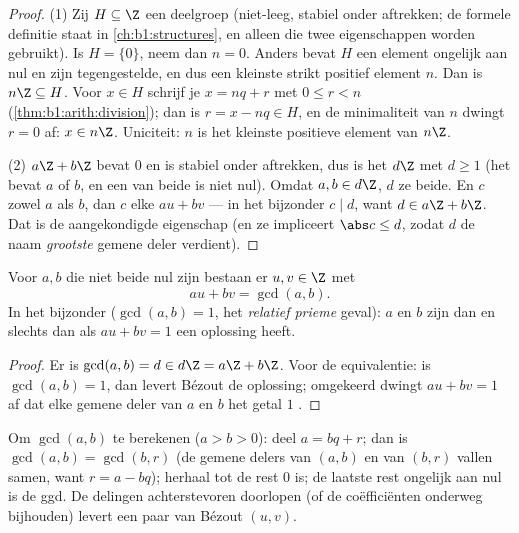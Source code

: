 \begin{proof}
(1) Zij $H \subseteq \Z$ een deelgroep (niet-leeg, stabiel onder
aftrekken; de formele definitie staat in \cref{ch:b1:structures}, en
alleen die twee eigenschappen worden gebruikt). Is $H = \{0\}$, neem dan
$n = 0$. Anders bevat $H$ een element ongelijk aan nul en zijn
tegengestelde, en dus een kleinste strikt positief element $n$. Dan is
$n\Z \subseteq H$. Voor $x \in H$ schrijf je $x = nq + r$ met $0 \leq r <
n$ (\cref{thm:b1:arith:division}); dan is $r = x - nq \in H$, en de
minimaliteit van $n$ dwingt $r = 0$ af: $x \in n\Z$. Uniciteit: $n$ is
het kleinste positieve element van $n\Z$.

(2) $a\Z + b\Z$ bevat $0$ en is stabiel onder aftrekken, dus is het $d\Z$
met $d \geq 1$ (het bevat $a$ of $b$, en een van beide is niet nul). Omdat
$a, b \in d\Z$,  $d$ ze beide. En  $c$ zowel $a$ als $b$, dan
 $c$ elke $au + bv$ --- in het bijzonder $c \mid d$, want $d \in a\Z
+ b\Z$. Dat is de aangekondigde eigenschap (en ze impliceert $\abs c \leq
d$, zodat $d$ de naam \emph{grootste} gemene deler verdient).
\end{proof}

\begin{corollary}\label{cor:b1:arith:bezout}
Voor $a, b$ die niet beide nul zijn bestaan er $u, v \in \Z$ met
\[
au + bv = \gcd(a, b) .
\]
In het bijzonder ($\gcd(a,b) = 1$, het \emph{relatief
prieme} geval): $a$ en $b$ zijn  dan
en slechts dan als $au + bv = 1$ een oplossing heeft.
\end{corollary}

\begin{proof}
Er is $\gcd(a,b) = d \in d\Z = a\Z + b\Z$. Voor de equivalentie: is
$\gcd(a,b) = 1$, dan levert Bézout de oplossing; omgekeerd dwingt $au +
bv = 1$ af dat elke gemene deler van $a$ en $b$ het getal $1$ .
\end{proof}

\begin{method}\label{met:b1:arith:euclid}
Om $\gcd(a, b)$ te berekenen ($a > b > 0$): deel $a = bq + r$; dan is
$\gcd(a, b) = \gcd(b, r)$ (de gemene delers van $(a,b)$ en van $(b,r)$
vallen samen, want $r = a - bq$); herhaal tot de rest $0$ is; de laatste
rest ongelijk aan nul is de ggd. De
delingen achterstevoren doorlopen (of de coëfficiënten onderweg
bijhouden) levert een paar van Bézout $(u, v)$.
\end{method}

